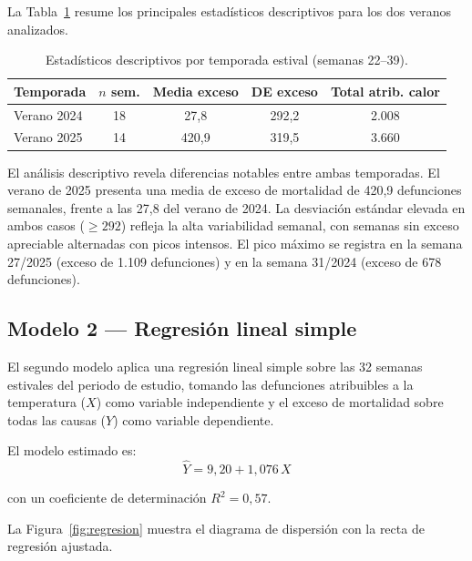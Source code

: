 \documentclass[11pt, a4paper]{article}
\begin{document}
La Tabla~\ref{tab:descriptiva} resume los principales estadísticos descriptivos
para los dos veranos analizados.

\begin{table}[H]
\centering
\caption{Estadísticos descriptivos por temporada estival (semanas 22--39).}
\label{tab:descriptiva}
\begin{tabular}{lcccc}
\toprule
\textbf{Temporada} & \textbf{$n$ sem.} &
\textbf{Media exceso} & \textbf{DE exceso} &
\textbf{Total atrib. calor} \\
\midrule
Verano 2024 & 18 & 27{,}8 & 292{,}2 & 2.008 \\
Verano 2025 & 14 & 420{,}9 & 319{,}5 & 3.660 \\
\bottomrule
\end{tabular}
\end{table}

El análisis descriptivo revela diferencias notables entre ambas temporadas.
El verano de 2025 presenta una media de exceso de mortalidad de 420{,}9
defunciones semanales, frente a las 27{,}8 del verano de 2024. La desviación
estándar elevada en ambos casos ($\geq 292$) refleja la alta variabilidad
semanal, con semanas sin exceso apreciable alternadas con picos intensos.
El pico máximo se registra en la semana 27/2025 (exceso de 1.109 defunciones)
y en la semana 31/2024 (exceso de 678 defunciones).

\subsection{Modelo 2 — Regresión lineal simple}

El segundo modelo aplica una regresión lineal simple sobre las 32 semanas
estivales del periodo de estudio, tomando las defunciones atribuibles a la
temperatura ($X$) como variable independiente y el exceso de mortalidad
sobre todas las causas ($Y$) como variable dependiente.

El modelo estimado es:
\begin{equation}
  \hat{Y} = 9{,}20 + 1{,}076\,X
  \label{eq:regresion}
\end{equation}

con un coeficiente de determinación $R^2 = 0{,}57$.

La Figura~\ref{fig:regresion} muestra el diagrama de dispersión con la recta
de regresión ajustada.
\end{document}
